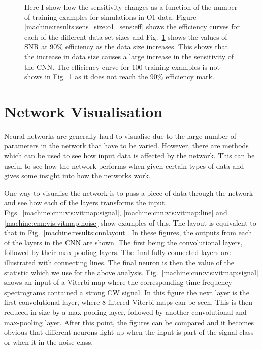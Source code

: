 \begin{figure}[h]
\begin{subfigure}[h]{0.5\textwidth}
		\caption{}
		\label{machine:results:sens_size:o1_sens:train}
	\end{subfigure}
	\caption[Sensitivity with size of data set for O1 simulations.]{Here I show how the sensitivity changes as a function of the number of training examples for simulations in O1 data. Figure \ref{machine:results:sens_size:o1_sens:eff} shows the efficiency curves for each of the different data-set sizes and Fig.~\ref{machine:results:sens_size:o1_sens:train} shows the values of \gls{SNR} at 90\% efficiency as the data size increases. This shows that the increase in data size causes a large increase in the sensitivity of the \gls{CNN}. The efficiency curve for 100 training examples is not shows in Fig.~\ref{machine:results:sens_size:o1_sens:train} as it does not reach the 90\% efficiency mark.}
	\label{machine:results:sens_size:o1_sens}
\end{figure}



\section{\label{cnn:networkvis}Network Visualisation}

Neural networks are generally hard to visualise due to the large number of parameters in the network that have to be varied.
However, there are methods which can be used to see how input data is affected by the network.
This can be useful to see how the network performs when given certain types of data and gives some insight into how the networks work.

One way to visualise the network is to pass a piece of data through the network and see how each of the layers transforms the input.
Figs.~\ref{machine:cnn:vis:vitmap:signal}, \ref{machine:cnn:vis:vitmap:line} and \ref{machine:cnn:vis:vitmap:noise} show examples of this.
The layout is equivalent to that in Fig.~\ref{machine:results:cnnlayout}.
In these figures, the outputs from each of the layers in the \gls{CNN} are shown. The first being the convolutional layers, followed by their max-pooling layers. 
The final fully connected layers are illustrated with connecting lines.
The final neuron is then the value of the statistic which we use for the above analysis.
Fig.~\ref{machine:cnn:vis:vitmap:signal} shows an input of a Viterbi map where the corresponding time-frequency spectrograms contained a strong \gls{CW} signal.
In this figure the next layer is the first convolutional layer, where 8 filtered Viterbi maps can be seen. 
This is then reduced in size by a max-pooling layer, followed by another convolutional and max-pooling layer.
After this point, the figures can be compared and it becomes obvious that different neurons light up when the input is part of the signal class or when it in the noise class.


